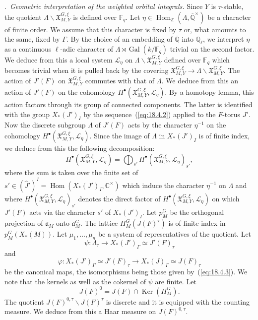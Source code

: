 \documentclass[12pt,a4paper,oneside,english,leqno]{smfart}
\makeatletter
\numberwithin{equation}{subsection}
\numberwithin{theo}{subsection}
\newenvironment{paragr}[1][]{\medskip\refstepcounter{subsection}%
  \par\noindent\hspace*{\parindent}\thesubsection.\ \emph{#1}%
  \@ifundefined{@empty}{}{}\ignorespaces}{\medskip}
\theoremstyle{plain}
\theoremstyle{definition}
\theoremstyle{remark}
\DeclareMathOperator{\Gal}{Gal}
\DeclareMathOperator{\Hom}{Hom}
\DeclareMathOperator{\Ker}{Ker}
\newcommand{\ZZ}{\mathbb{Z}}
\newcommand{\CC}{\mathbb{C}}
\newcommand{\Fq}{\mathbb{F}_q}
\newcommand{\Ql}{\mathbb{Q}_{\ell}}
\newcommand{\Qb}{\overline{\mathbb{Q}}}
\newcommand{\lc}{\mathcal{L}}
\newcommand{\ago}{\mathfrak{a}}
\newcommand{\Xgo}{\mathfrak{X}}
\newcommand{\Ga}{\Gamma}
\newcommand{\back}{\backslash}
\makeatother
\begin{document}
\begin{paragr}[Geometric interpretation of the weighted orbital integrals.]\label{S:18.5}
Since $Y$ is $\tau$-stable, the quotient $\Lambda\back\Xgo_{M,Y}^{G,\xi}$ is defined over $\Fq$. Let $\eta\in\Hom_\ZZ(\Lambda,\Qb^\times)$ be a character of finite order. We assume that this character is fixed by $\tau$ or, what amounts to the same, fixed by $\Ga$. By the choice of an embedding of $\Qb$ into $\Ql$, we interpret $\eta$ as a continuous $\ell$-adic character of $\Lambda\rtimes\Gal(k/\Fq)$ trivial on the second factor. We deduce from this a local system $\lc_\eta$ on $\Lambda\back\Xgo_{M,Y}^{G,\xi}$ defined over $\Fq$ which becomes trivial when it is pulled back by the covering $\Xgo_{M,Y}^{G,\xi}\to\Lambda\back\Xgo_{M,Y}^{G,\xi}$. The action of $J'(F)$ on $\Xgo_{M,Y}^{G,\xi}$ commutes with that of $\Lambda$. We deduce from this an action of $J'(F)$ on the cohomology $H^\bullet(\Xgo_{M,Y}^{G,\xi},\lc_\eta)$. By a homotopy lemma, this action factors through its group of connected components. The latter is identified with the group $X_*(J')_I$ by the sequence~(\ref{eq:18.4.2}) applied to the $F$-torus $J'$. Now the discrete subgroup $\Lambda$ of $J'(F)$ acts by the character $\eta^{-1}$ on the cohomology $H^\bullet(\Xgo_{M,Y}^{G,\xi},\lc_\eta)$. Since the image of $\Lambda$ in $X_*(J')_I$ is of finite index, we deduce from this the following decomposition:
\begin{equation}\label{eq:18.5.1}
H^\bullet(\Xgo_{M,Y}^{G,\xi},\lc_\eta)=\bigoplus_{s'}
H^\bullet(\Xgo_{M,Y}^{G,\xi},\lc_\eta)_{s'},
\end{equation}
where the sum is taken over the finite set of $s'\in(\hat{J}')^I= \Hom(X_*(J')_I,\CC^\times)$ which induce the character $\eta^{-1}$ on $\Lambda$ and where $H^\bullet(\Xgo_{M,Y}^{G,\xi},\lc_\eta)_{s'}$ denotes the direct factor of $H^\bullet(\Xgo_{M,Y}^{G,\xi},\lc_\eta)$ on which $J'(F)$ acts via the character $s'$ of $X_*(J')_I$. Let $p_M^G$ be the orthogonal projection of $\ago_M$ onto $\ago_M^G$. The lattice $H_M^G(J(F)^\tau)$ is of finite index in $p_M^G(X_*(M))$. Let $\mu_1,\ldots,\mu_n$ be a system of representatives of the quotient. Let
$$
\psi:\Lambda_\tau\to X_*(J')_\Ga\simeq J'(F)_\tau
$$
and
$$
\varphi:X_*(J')_\Ga\simeq J'(F)_\tau\to X_*(J)_\Ga\simeq J(F)_\tau
$$
be the canonical maps, the isomorphisms being those given by~(\ref{eq:18.4.3}). We note that the kernels as well as the cokernel of $\psi$ are finite. Let
$$
J(F)^0=J(F)\cap\Ker(H_M^G).
$$
The quotient $J(F)^{0,\tau}\back J(F)^\tau$ is discrete and it is equipped with the counting measure. We deduce from this a Haar measure on $J(F)^{0,\tau}$.


\end{paragr}
\end{document}
